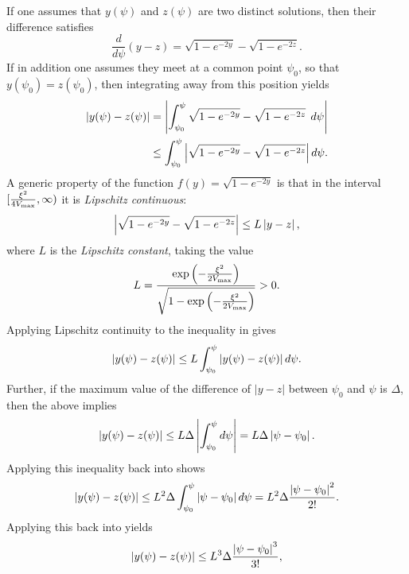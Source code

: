 If one assumes that $y(\psi)$ and $z(\psi)$ are two distinct
solutions, then their difference satisfies
%
\begin{equation}
  \frac{d}{d\psi}(y-z)
  =
  \sqrt{1-e^{-2y}} - \sqrt{1-e^{-2z}}.
  \label{eqn:master_diff}
\end{equation}
%
If in addition one assumes they meet at a common point $\psi_0$, so
that $y(\psi_0)=z(\psi_0)$, then integrating away from this position
yields
%
\begin{align}
  \left|y(\psi)-z(\psi)\right|
  &=
  \left|\int_{\psi_0}^\psi \sqrt{1-e^{-2y}}
  - \sqrt{1-e^{-2z}}\:\:d\psi\right|
  \nonumber\\
  &
  \le \int_{\psi_0}^\psi \left|\sqrt{1-e^{-2y}}
  - \sqrt{1-e^{-2z}}\right|d\psi.
  \label{eqn:ineq_1}
\end{align}
%
A generic property of the function $f(y)=\sqrt{1-e^{-2y}}$ is that in
the interval $[\frac{\xi^2}{4V_\mathrm{max}},\infty)$ it is {\em Lipschitz
continuous}\/:
%
\begin{equation}
  \left|\sqrt{1-e^{-2y}} - \sqrt{1-e^{-2z}}\right| \le L\left|y-z\right|,
  \label{eqn:Lipschitz}
\end{equation}
%
where $L$ is the {\em Lipschitz constant}, taking the value
%
\begin{equation}
  L
  = 
  \frac{\exp{\left(-\frac{\xi^2}{2V_\mathrm{max}}\right)}}
  {\sqrt{1-\exp{\left(-\frac{\xi^2}{2V_\mathrm{max}}\right)}}} 
  > 0.
\end{equation}
%                                              
Applying Lipschitz continuity  to the inequality
in  gives    
%
\begin{equation}
  \left|y(\psi)-z(\psi)\right| 
  \le
  L\int_{\psi_0}^\psi\left|y(\psi)-z(\psi)\right|d\psi.
  \label{eqn:ineq_2}
\end{equation}
%
Further, if the maximum value of the difference of $|y-z|$ between
$\psi_0$ and $\psi$ is $\Delta$, then the above implies
%
\begin{equation}
  \left|y(\psi)-z(\psi)\right| 
  \le
  L\Delta\left|\int_{\psi_0}^\psi d\psi\right|= 
  L\Delta\left|\psi-\psi_0\right|.
\end{equation}
%
Applying this inequality back into  shows
%
\begin{equation}
  \left|y(\psi)-z(\psi)\right| 
  \le
  L^2\Delta\int_{\psi_0}^\psi\left|\psi-\psi_0\right|d\psi =
  L^2\Delta\frac{\left|\psi-\psi_0\right|^2}{2!}.
\end{equation}
%
Applying this back into  yields
%
\begin{equation}
  \left|y(\psi)-z(\psi)\right| 
  \le
  L^3\Delta\frac{\left|\psi-\psi_0\right|^3}{3!},
\end{equation}
